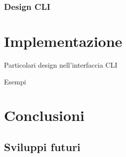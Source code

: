 \documentclass[12pt,a4paper,openright,twoside]{book}
\begin{document}
\subsection{Design CLI}

\chapter{Implementazione}

\begin{list}{possibili inserimenti}{spacing}
	\item Particolari design nell'interfaccia CLI
	\item Esempi
\end{list}

\chapter{Conclusioni}

\section{Sviluppi futuri}


\backmatter

\nocite{*} %



\end{document}
